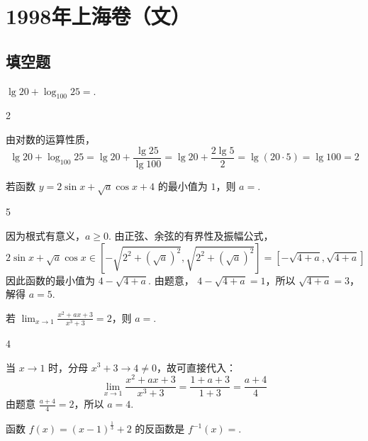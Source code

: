\chapter{1998年上海卷（文）}
\section{填空题}

\begin{problem}
\(\lg20 + \log_{100}25 = \)\fillinblank{}.
\end{problem}

\begin{answer}
2
\end{answer}

\begin{solution}
由对数的运算性质，
\[
\lg20+\log_{100}25=\lg20+\frac{\lg25}{\lg100}=\lg20+\frac{2\lg5}{2}=\lg(20\cdot5)=\lg100=2
\]
\end{solution}

\begin{problem}
若函数 \(y = 2\sin x + \sqrt{a} \cos x + 4 \) 的最小值为 \(1\)，则 \(a=\)\fillinblank{}.
\end{problem}

\begin{answer}
5
\end{answer}

\begin{solution}
因为根式有意义，\(a\geqslant0\). 由正弦、余弦的有界性及振幅公式，
\[
2\sin x+\sqrt a\cos x\in\left[-\sqrt{2^2+(\sqrt a)^2},\sqrt{2^2+(\sqrt a)^2}\right]=\left[-\sqrt{4+a},\sqrt{4+a}\right]
\]
因此函数的最小值为 \(4-\sqrt{4+a}\). 由题意，
\(4-\sqrt{4+a}=1\)，所以 \(\sqrt{4+a}=3\)，解得 \(a=5\).
\end{solution}

\begin{problem}
若 \(\displaystyle\lim_{x\to1}\frac{x^{2}+ax+3}{x^{3}+3}=2 \)，则 \(a=\)\fillinblank{}.
\end{problem}

\begin{answer}
4
\end{answer}

\begin{solution}
当 \(x\to1\) 时，分母 \(x^3+3\to4\ne0\)，故可直接代入：
\[
\lim_{x\to1}\frac{x^2+ax+3}{x^3+3}=\frac{1+a+3}{1+3}=\frac{a+4}{4}
\]
由题意 \(\frac{a+4}{4}=2\)，所以 \(a=4\).
\end{solution}

\begin{problem}
函数 \(f(x)=(x-1)^{\frac{1}{3}}+2 \) 的反函数是 \(f^{-1}(x)= \)\fillinblank{}.
\end{problem}

